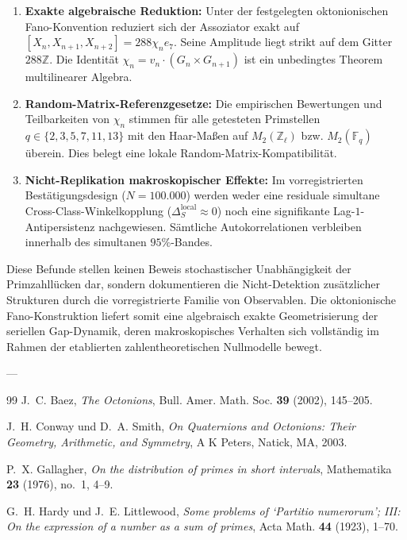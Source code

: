 \documentclass[11pt,a4paper]{article}
\theoremstyle{plain}
\theoremstyle{definition}
\theoremstyle{remark}
\begin{document}
\begin{enumerate}
    \item \textbf{Exakte algebraische Reduktion:} Unter der festgelegten oktonionischen Fano-Konvention reduziert sich der Assoziator exakt auf $[X_n, X_{n+1}, X_{n+2}] = 288\chi_n e_7$. Seine Amplitude liegt strikt auf dem Gitter $288\mathbb{Z}$. Die Identität $\chi_n = v_n \cdot (G_n \times G_{n+1})$ ist ein unbedingtes Theorem multilinearer Algebra.
    \item \textbf{Random-Matrix-Referenzgesetze:} Die empirischen Bewertungen und Teilbarkeiten von $\chi_n$ stimmen für alle getesteten Primstellen $q \in \{2, 3, 5, 7, 11, 13\}$ mit den Haar-Maßen auf $M_2(\mathbb{Z}_\ell)$ bzw. $M_2(\mathbb{F}_q)$ überein. Dies belegt eine lokale Random-Matrix-Kompatibilität.
    \item \textbf{Nicht-Replikation makroskopischer Effekte:} Im vorregistrierten Bestätigungsdesign ($N=100.000$) werden weder eine residuale simultane Cross-Class-Winkelkopplung ($\Delta_S^{\mathrm{local}} \approx 0$) noch eine signifikante Lag-$1$-Antipersistenz nachgewiesen. Sämtliche Autokorrelationen verbleiben innerhalb des simultanen $95\%$-Bandes.
\end{enumerate}

Diese Befunde stellen keinen Beweis stochastischer Unabhängigkeit der Primzahllücken dar, sondern dokumentieren die Nicht-Detektion zusätzlicher Strukturen durch die vorregistrierte Familie von Observablen. Die oktonionische Fano-Konstruktion liefert somit eine algebraisch exakte Geometrisierung der seriellen Gap-Dynamik, deren makroskopisches Verhalten sich vollständig im Rahmen der etablierten zahlentheoretischen Nullmodelle bewegt.

---

\begin{thebibliography}{99}
J.~C. Baez, \emph{The Octonions}, Bull. Amer. Math. Soc. \textbf{39} (2002), 145--205.

J.~H. Conway und D.~A. Smith, \emph{On Quaternions and Octonions: Their Geometry, Arithmetic, and Symmetry}, A K Peters, Natick, MA, 2003.

P.~X. Gallagher, \emph{On the distribution of primes in short intervals}, Mathematika \textbf{23} (1976), no.~1, 4--9.

G.~H. Hardy und J.~E. Littlewood, \emph{Some problems of `Partitio numerorum'; III: On the expression of a number as a sum of primes}, Acta Math. \textbf{44} (1923), 1--70.
\end{thebibliography}
\end{document}
